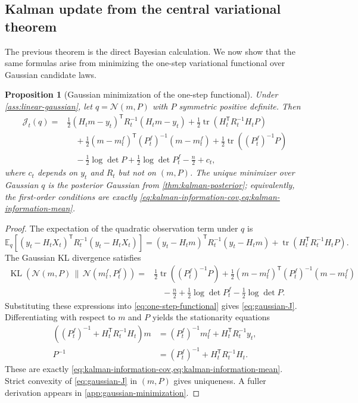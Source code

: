 \documentclass[11pt]{article}
\newcommand{\E}{\mathbb{E}}
\newcommand{\KL}{\operatorname{KL}}
\newcommand{\tr}{\operatorname{tr}}
\newcommand{\bracks}[1]{\left[ #1 \right]}
\newcommand{\parens}[1]{\left( #1 \right)}
\newcommand{\transpose}{^{\mathsf T}}
\newcommand{\mc}{\mathcal}
\numberwithin{equation}{section}
\theoremstyle{plain}
\newtheorem{proposition}[theorem]{Proposition}
\theoremstyle{definition}
\theoremstyle{remark}
\begin{document}
\subsection{Kalman update from the central variational theorem}

The previous theorem is the direct Bayesian calculation. We now show that the same formulas arise from minimizing the one-step variational functional over Gaussian candidate laws.

\begin{proposition}[Gaussian minimization of the one-step functional]
\label{prop:gaussian-functional}
Under \cref{ass:linear-gaussian}, let $q=\mathcal N(m,P)$ with $P$ symmetric positive definite. Then
\begin{align}
\mc J_t(q)
={}&
\frac12 (H_tm-y_t)\transpose R_t^{-1}(H_tm-y_t)
+\frac12\tr\parens{H_t\transpose R_t^{-1}H_tP}
\nonumber\\
&\quad
+\frac12 (m-m_t^f)\transpose (P_t^f)^{-1}(m-m_t^f)
+\frac12\tr\parens{(P_t^f)^{-1}P}
\nonumber\\
&\quad
-\frac12\log\det P
+\frac12\log\det P_t^f
-\frac n2
+c_t,
\label{eq:gaussian-J}
\end{align}
where $c_t$ depends on $y_t$ and $R_t$ but not on $(m,P)$. The unique minimizer over Gaussian $q$ is the posterior Gaussian from \cref{thm:kalman-posterior}; equivalently, the first-order conditions are exactly \cref{eq:kalman-information-cov,eq:kalman-information-mean}.
\end{proposition}

\begin{proof}
The expectation of the quadratic observation term under $q$ is
\[
\E_q\!\bracks{(y_t-H_tX_t)\transpose R_t^{-1}(y_t-H_tX_t)}
=
(y_t-H_tm)\transpose R_t^{-1}(y_t-H_tm)
+\tr\parens{H_t\transpose R_t^{-1}H_tP}.
\]
The Gaussian KL divergence satisfies
\begin{align*}
\KL\parens{\mathcal N(m,P)\,\|\,\mathcal N(m_t^f,P_t^f)}
= {}&
\frac12\tr\parens{(P_t^f)^{-1}P}
+\frac12(m-m_t^f)\transpose (P_t^f)^{-1}(m-m_t^f)
\nonumber\\
&\quad
-\frac n2
+\frac12\log\det P_t^f
-\frac12\log\det P.
\end{align*}
Substituting these expressions into \cref{eq:one-step-functional} gives \cref{eq:gaussian-J}. Differentiating with respect to $m$ and $P$ yields the stationarity equations
\begin{align*}
\parens{(P_t^f)^{-1}+H_t\transpose R_t^{-1}H_t}m
&=
(P_t^f)^{-1}m_t^f + H_t\transpose R_t^{-1}y_t, \\
P^{-1}
&=
(P_t^f)^{-1}+H_t\transpose R_t^{-1}H_t.
\end{align*}
These are exactly \cref{eq:kalman-information-cov,eq:kalman-information-mean}. Strict convexity of \cref{eq:gaussian-J} in $(m,P)$ gives uniqueness. A fuller derivation appears in \cref{app:gaussian-minimization}.
\end{proof}
\end{document}
